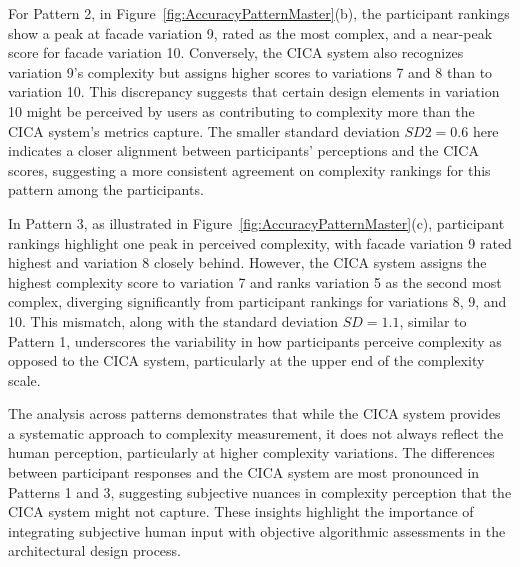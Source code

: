 For Pattern 2, in Figure~\ref{fig:AccuracyPatternMaster}(b), the participant rankings show a peak at facade variation 9, rated as the most complex, and a near-peak score for facade variation 10.
Conversely, the CICA system also recognizes variation 9's complexity but assigns higher scores to variations 7 and 8 than to variation 10.
This discrepancy suggests that certain design elements in variation 10 might be perceived by users as contributing to complexity more than the CICA system's metrics capture.
The smaller standard deviation \(SD2 = 0.6\) here indicates a closer alignment between participants’ perceptions and the CICA scores, suggesting a more consistent agreement on complexity rankings for this pattern among the participants.

In Pattern 3, as illustrated in Figure~\ref{fig:AccuracyPatternMaster}(c), participant rankings highlight one peak in perceived complexity, with facade variation 9 rated highest and variation 8 closely behind.
However, the CICA system assigns the highest complexity score to variation 7 and ranks variation 5 as the second most complex, diverging significantly from participant rankings for variations 8, 9, and 10.
This mismatch, along with the standard deviation \(SD = 1.1\), similar to Pattern 1, underscores the variability in how participants perceive complexity as opposed to the CICA system, particularly at the upper end of the complexity scale.

The analysis across patterns demonstrates that while the CICA system provides a systematic approach to complexity measurement, it does not always reflect the human perception, particularly at higher complexity variations.
The differences between participant responses and the CICA system are most pronounced in Patterns 1 and 3, suggesting subjective nuances in complexity perception that the CICA system might not capture.
These insights highlight the importance of integrating subjective human input with objective algorithmic assessments in the architectural design process.



